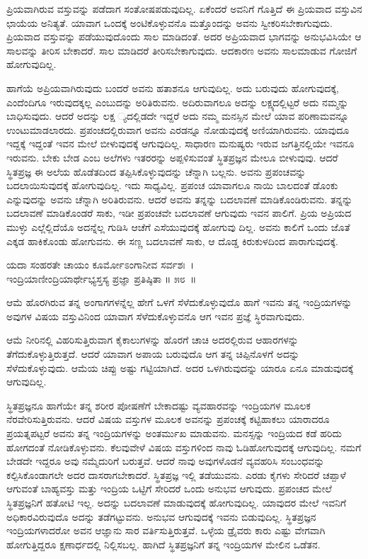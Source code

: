 ಪ್ರಿಯವಾಗಿರುವ ವಸ್ತುವನ್ನು ಪಡೆದಾಗ ಸಂತೋಷಪಡುವುದಿಲ್ಲ. ಏಕೆಂದರೆ ಅವನಿಗೆ ಗೊತ್ತಿದೆ ಈ ಪ್ರಿಯವಾದ ವಸ್ತುವಿನ ಛಾಯೆಯ ಅನಿತ್ಯತೆ. ಯಾವಾಗ ಒಂದಕ್ಕೆ ಅಂಟಿಕೊಳ್ಳುವನೊ ಮತ್ತೊಂದನ್ನು ಅವನು ಸ್ವೀಕರಿಸಬೇಕಾಗುವುದು. ಪ್ರಿಯವಾದ ವಸ್ತುವನ್ನು ಪಡೆಯುವುದೊಂದು ಸಾಲ ಮಾಡಿದಂತೆ. ಅದರ ಅಪ್ರಿಯವಾದ ಭಾಗವನ್ನು ಅನುಭವಿಸಿಯೇ ಆ ಸಾಲವನ್ನು ತೀರಿಸ ಬೇಕಾದರೆ. ಸಾಲ ಮಾಡಿದರೆ ತೀರಿಸಬೇಕಾಗುವುದು. ಆದಕಾರಣ ಅವನು ಸಾಲಮಾಡುವ ಗೋಜಿಗೆ ಹೋಗುವುದಿಲ್ಲ.

ಹಾಗೆಯೆ ಅಪ್ರಿಯವಾಗಿರುವುದು ಬಂದರೆ ಅವನು ಹತಾಶನೂ ಆಗುವುದಿಲ್ಲ. ಅದು ಬರುವುದು ಹೋಗುವುದಕ್ಕೆ, ಎಂದೆಂದಿಗೂ ಇರುವುದಕ್ಕಲ್ಲ ಎಂಬುದನ್ನು ಅರಿತಿರುವನು. ಅದಿರುವಾಗಲೂ ಅದನ್ನು ಲಕ್ಷ್ಯದಲ್ಲಿಟ್ಟರೆ ಅದು ನಮ್ಮನ್ನು ಬಾಧಿಸುವುದು. ಆದರೆ ಅದನ್ನು ಲಕ್ಷ ್ಯದಲ್ಲಿಡದೇ ಇದ್ದರೆ ಅದು ನಮ್ಮ ಮನಸ್ಸಿನ ಮೇಲೆ ಯಾವ ಪರಿಣಾಮವನ್ನೂ ಉಂಟುಮಾಡಲಾರದು. ಪ್ರಪಂಚದಲ್ಲಿರುವಾಗ ಅವನು ಎರಡನ್ನೂ ನೋಡುವುದಕ್ಕೆ ಅಣಿಯಾಗಿರುವನು. ಯಾವುದೂ ಇದ್ದಕ್ಕೆ ಇದ್ದಂತೆ ಇವನ ಮೇಲೆ ಬೀಳುವುದಕ್ಕೆ ಆಗುವುದಿಲ್ಲ. ಸಾಧಾರಣ ಮನುಷ್ಯರು ಇರುವ ಜಗತ್ತಿನಲ್ಲಿಯೇ ಇವನೂ ಇರುವನು. ಬೇಕು ಬೇಡ ಎಂಬ ಅಲೆಗಳು ಇತರರನ್ನು ಅಪ್ಪಳಿಸುವಂತೆ ಸ್ಥಿತಪ್ರಜ್ಞನ ಮೇಲೂ ಬೀಳುವುವು. ಆದರೆ ಸ್ಥಿತಪ್ರಜ್ಞ ಈ ಅಲೆಯ ಹೊಡೆತದಿಂದ ತಪ್ಪಿಸಿಕೊಳ್ಳುವುದನ್ನು ಚೆನ್ನಾಗಿ ಬಲ್ಲನು. ಅವನು ಪ್ರಪಂಚವನ್ನು ಬದಲಾಯಿಸುವುದಕ್ಕೆ ಹೋಗುವುದಿಲ್ಲ. ಇದು ಸಾಧ್ಯವಿಲ್ಲ. ಪ್ರಪಂಚ ಯಾವಾಗಲೂ ನಾಯಿ ಬಾಲದಂತೆ ಡೊಂಕು ಎನ್ನುವುದನ್ನು ಅವನು ಚೆನ್ನಾಗಿ ಅರಿತಿರುವನು. ಆದರೆ ಅವನು ತನ್ನನ್ನು ಬದಲಾವಣೆ ಮಾಡಿಕೊಂಡಿರುವನು. ತನ್ನನ್ನು ಬದಲಾವಣೆ ಮಾಡಿಕೊಂಡರೆ ಸಾಕು, ಇಡೀ ಪ್ರಪಂಚವೇ ಬದಲಾವಣೆ ಆಗುವುದು ಇವನ ಪಾಲಿಗೆ. ಪ್ರಿಯ ಅಪ್ರಿಯದ ಮುಳ್ಳು ಎಲ್ಲೆಲ್ಲಿದೆಯೊ ಅದನ್ನೆಲ್ಲ ಗುಡಿಸಿ ಆಚೆಗೆ ಎಸೆಯುವುದಕ್ಕೆ ಹೋಗುವು ದಿಲ್ಲ. ಅವನು ಕಾಲಿಗೆ ಒಂದು ಜೊತೆ ಎಕ್ಕಡ ಹಾಕಿಕೊಂಡು ಹೋಗುವನು. ಈ ಸಣ್ಣ ಬದಲಾವಣೆ ಸಾಕು, ಆ ದೊಡ್ಡ ಕಿರುಕುಳದಿಂದ ಪಾರಾಗುವುದಕ್ಕೆ.

\begin{shloka}
ಯದಾ ಸಂಹರತೇ ಚಾಯಂ ಕೂರ್ಮೋಽಂಗಾನೀವ ಸರ್ವಶಃ~।\\ಇಂದ್ರಿಯಾಣೀಂದ್ರಿಯಾರ್ಥೇಭ್ಯಸ್ತಸ್ಯ ಪ್ರಜ್ಞಾ ಪ್ರತಿಷ್ಠಿತಾ \hfill॥ ೫೮~॥
\end{shloka}

\begin{artha}
ಆಮೆ ಹೊರಗಿರುವ ತನ್ನ ಅಂಗಾಗಗಳನ್ನೆಲ್ಲ ಹೇಗೆ ಒಳಗೆ ಸೆಳೆದುಕೊಳ್ಳುವುದೊ ಹಾಗೆ ಇವನು ತನ್ನ ಇಂದ್ರಿಯಗಳನ್ನು ಅವುಗಳ ವಿಷಯ ವಸ್ತುವಿನಿಂದ ಯಾವಾಗ ಸೆಳೆದುಕೊಳ್ಳುವನೊ ಆಗ ಇವನ ಪ್ರಜ್ಞೆ ಸ್ಥಿರವಾಗುವುದು.
\end{artha}

ಆಮೆ ನೀರಿನಲ್ಲಿ ವಿಹರಿಸುತ್ತಿರುವಾಗ ಕೈಕಾಲುಗಳನ್ನು ಹೊರಗೆ ಚಾಚಿ ಅದರಲ್ಲಿರುವ ಆಹಾರಗಳನ್ನು ತೆಗೆದುಕೊಳ್ಳುತ್ತಿರುತ್ತದೆ. ಆದರೆ ಯಾವಾಗ ಅಪಾಯ ಬರುವುದೊ ಆಗ ತನ್ನ ಚಿಪ್ಪಿನೊಳಗೆ ಅದನ್ನು ಸೆಳೆದುಕೊಳ್ಳುವುದು. ಆಮೆಯ ಚಿಪ್ಪು ಅಷ್ಟು ಗಟ್ಟಿಯಾಗಿದೆ. ಅದರ ಒಳಗಿರುವುದನ್ನು ಯಾರೂ ಏನೂ ಮಾಡುವುದಕ್ಕೆ ಆಗುವುದಿಲ್ಲ.

ಸ್ಥಿತಪ್ರಜ್ಞನೂ ಹಾಗೆಯೇ ತನ್ನ ಶರೀರ ಪೋಷಣೆಗೆ ಬೇಕಾದಷ್ಟು ವ್ಯವಹಾರವನ್ನು ಇಂದ್ರಿಯಗಳ ಮೂಲಕ ನೆರವೇರಿಸುತ್ತಿರುವನು. ಆದರೆ ವಿಷಯ ವಸ್ತುಗಳ ಮೂಲಕ ಅವನನ್ನು ಪ್ರಪಂಚಕ್ಕೆ ಕಟ್ಟಿಹಾಕಲು ಯಾರಾದರೂ ಪ್ರಯತ್ನಪಟ್ಟರೆ ಅವನು ತನ್ನ ಇಂದ್ರಿಯಗಳನ್ನು ಅಂತರ್ಮುಖ ಮಾಡುವನು. ಮನಸ್ಸನ್ನು ಇಂದ್ರಿಯದ ಕಡೆ ಹರಿದು ಹೋಗದಂತೆ ನೋಡಿಕೊಳ್ಳುವನು. ಕೆಲವುವೇಳೆ ವಿಷಯ ವಸ್ತುಗಳಿಂದ ನಾವು ಓಡಿಹೋಗುವುದಕ್ಕೆ ಆಗುವುದಿಲ್ಲ. ನಮಗೆ ಬೇಡದೇ ಇದ್ದರೂ ಅವು ನಮ್ಮೆದುರಿಗೆ ಬರುತ್ತವೆ. ಆದರೆ ನಾವು ಅವುಗಳೊಡನೆ ವ್ಯವಹರಿಸಿ ಸಂಬಂಧವನ್ನು ಕಲ್ಪಿಸಿಕೊಂಡಾಗಲೇ ಅದರ ದಾಸರಾಗಬೇಕಾದರೆ. ಸ್ಥಿತಪ್ರಜ್ಞ ಇಲ್ಲಿ ತಡೆಯುವನು. ಎರಡು ಕೈಗಳು ಸೇರಿದರೆ ಚಪ್ಪಾಳೆ ಆಗುವಂತೆ ಬಾಹ್ಯವಸ್ತು ಮತ್ತು ಇಂದ್ರಿಯ ಒಟ್ಟಿಗೆ ಸೇರಿದರೆ ಒಂದು ಅನುಭವ ಆಗುವುದು. ಪ್ರಪಂಚದ ಮೇಲೆ ಸ್ಥಿತಪ್ರಜ್ಞನಿಗೆ ಹತೋಟಿ ಇಲ್ಲ. ಅದನ್ನು ಬದಲಾವಣೆ ಮಾಡುವುದಕ್ಕೆ ಹೋಗುವುದಿಲ್ಲ. ಯಾವುದರ ಮೇಲೆ ಇವನಿಗೆ ಅಧಿಕಾರವಿರುವುದೊ ಅದನ್ನು ತಡೆಗಟ್ಟುವನು. ಅನುಭವ ಆಗುವುದಕ್ಕೆ ಇವನು ಬಿಡುವುದಿಲ್ಲ. ಸ್ಥಿತಪ್ರಜ್ಞನ ಇಂದ್ರಿಯಗಳಾದರೋ ಅವನ ಆಜ್ಞಾನು ಸಾರ ವರ್ತಿಸುತ್ತಿರುತ್ತವೆ. ಒಳ್ಳೆಯ ಡ್ರೈವರು ಕಾರು ಎಷ್ಟು ವೇಗವಾಗಿ ಹೋಗುತ್ತಿದ್ದರೂ ಕ್ಷಣಾರ್ಧದಲ್ಲಿ ನಿಲ್ಲಿಸಬಲ್ಲ. ಹಾಗಿದೆ ಸ್ಥಿತಪ್ರಜ್ಞನಿಗೆ ತನ್ನ ಇಂದ್ರಿಯಗಳ ಮೇಲಿನ ಒಡೆತನ.

